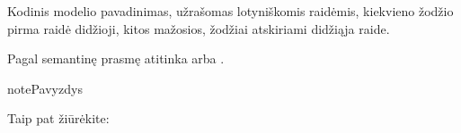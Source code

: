 \documentclass[letterpaper,10pt,lithuanian]{sphinxmanual}
\begin{document}
\begin{fulllineitems}
\label{\detokenize{formatas:model}}
\pysigstartsignatures
{}
\pysigstopsignatures
\sphinxAtStartPar
{}

\sphinxAtStartPar
Kodinis modelio pavadinimas, užrašomas lotyniškomis raidėmis, kiekvieno
žodžio pirma raidė didžioji, kitos mažosios, žodžiai atskiriami didžiąja
raide.

\sphinxAtStartPar
Pagal semantinę prasmę atitinka  arba .

\begin{sphinxadmonition}{note}{Pavyzdys}

\begin{DUlineblock}{0em}
\item[] 
\item[] 
\end{DUlineblock}
\end{sphinxadmonition}


\begin{sphinxseealso}{Taip pat žiūrėkite:}

\begin{DUlineblock}{0em}
\item[] {\hyperref[\detokenize{dimensijos:model}]{}}
\item[] {\hyperref[\detokenize{modelis:modelis}]{}}
\end{DUlineblock}


\end{sphinxseealso}


\end{fulllineitems}

\end{document}
